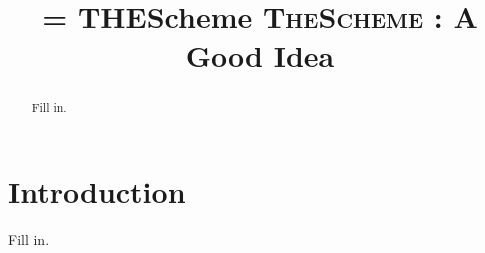 \documentclass[preprint,10pt,numbers]{acg_sigplanconf_v32}
\makeatletter
\DeclareRobustCommand{\Name}{%
  \ifnum\pdf@strcmp{\f@family}{\sfdefault}=\z@
    THEScheme\xspace%
  \else
    \textsc{TheScheme}\xspace%
  \fi
}
\makeatother
\begin{document}
\setlength{\pdfpageheight}{\paperheight}
\setlength{\pdfpagewidth}{\paperwidth}




\title{\Name: A Good Idea}

\authorinfo{}{}{}

\maketitle

\begin{abstract}
Fill in.
\end{abstract}



\section{Introduction}

Fill in.


\end{document}
